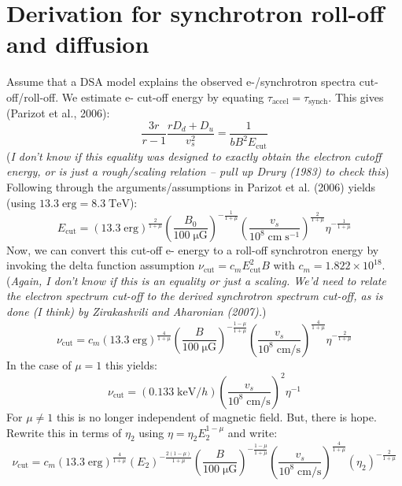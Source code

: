 \documentclass[iop, apj, numberedappendix]{emulateapj}
\newcommand*{\mt}{\mathrm}
\newcommand*{\unit}[1]{\;\mt{#1}}  %
\newcommand*{\Ecut}{E_{\mt{cut}}}
\newcommand*{\muG}{\unit{\mu G}}
\begin{document}
\clearpage
\section{Derivation for synchrotron roll-off and diffusion}


Assume that a DSA model explains the observed e-/synchrotron spectra
cut-off/roll-off.  We estimate e- cut-off energy by equating
$\tau_{\mt{accel}} = \tau_{\mt{synch}}$.  This gives (Parizot et al., 2006):
\begin{equation}
    \frac{3r}{r-1} \frac{r D_d + D_u}{v_s^2} = \frac{1}{b B^2 \Ecut}
\end{equation}
(\emph{I don't know if this equality was designed to exactly obtain the electron
cutoff energy, or is just a rough/scaling relation -- pull up Drury (1983) to
check this})
Following through the arguments/assumptions in Parizot et al. (2006) yields
(using $13.3 \unit{erg} = 8.3 \unit{TeV}$):
\begin{equation}
    \Ecut =
        \left( 13.3 \unit{erg} \right)^{\frac{2}{1+\mu}}
        \left( \frac{B_0}{100 \muG} \right)^{-\frac{1}{1+\mu}}
        \left( \frac{v_s}{10^8 \unit{cm\;s^{-1}}} \right)^{\frac{2}{1+\mu}}
        \eta^{-\frac{1}{1+\mu}}
\end{equation}
Now, we can convert this cut-off e- energy to a roll-off synchrotron energy by
invoking the delta function assumption $\nu_{\mt{cut}} = c_m \Ecut^2 B$ with
$c_m = 1.822 \times 10^{18}$.
(\emph{Again, I don't know if this is an equality or just a scaling.  We'd need
to relate the electron spectrum cut-off to the derived synchrotron spectrum
cut-off, as is done (I think) by Zirakashvili and Aharonian (2007).})
\begin{equation}
    \nu_{\mt{cut}} = c_m
        \left( 13.3 \unit{erg} \right)^{\frac{4}{1+\mu}}
        \left( \frac{B}{100\muG} \right)^{-\frac{1-\mu}{1+\mu}}
        \left( \frac{v_s}{10^8 \unit{cm/s}} \right)^{\frac{4}{1+\mu}}
        \eta^{-\frac{2}{1+\mu}}
\end{equation}
In the case of $\mu = 1$ this yields:
\begin{equation}
    \nu_{\mt{cut}} = (0.133 \unit{keV} / h)
        \left( \frac{v_s}{10^8 \unit{cm/s}} \right)^{2}
        \eta^{-1}
\end{equation}
For $\mu \neq 1$ this is no longer independent of magnetic field.  But,
there is hope.  Rewrite this in terms of $\eta_2$ using
$\eta = \eta_2 E_2^{1-\mu}$ and write:
\[
    \nu_{\mt{cut}} = c_m
        \left( 13.3 \unit{erg} \right)^{\frac{4}{1+\mu}}
        \left( E_2 \right)^{-\frac{2(1-\mu)}{1+\mu}}
        \left( \frac{B}{100\muG} \right)^{-\frac{1-\mu}{1+\mu}}
        \left( \frac{v_s}{10^8 \unit{cm/s}} \right)^{\frac{4}{1+\mu}}
        \left( \eta_2 \right)^{-\frac{2}{1+\mu}}
\]
\end{document}
